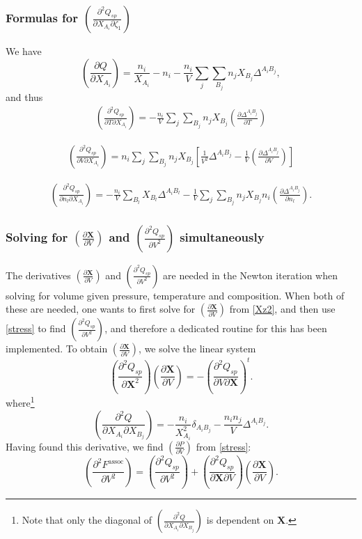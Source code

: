 \documentclass[internal,english]{sintefmemo2012}
\newcommand{\mbf}[0]{\mathbf}
\newcommand*{\pder}[2]{\left(\frac{\partial #1}{\partial #2}\right)}
\newcommand*{\pdder}[2]{\left(\frac{\partial^2 #1}{\partial #2^2}\right)}
\newcommand*{\pdcross}[3]{\left(\frac{\partial^2 #1}{\partial #2 \partial #3}\right)}
\newcommand{\z}{\zeta}
\begin{document}
\subsubsection{Formulas for $\pdcross{Q_{sp}}{X_{A_i}}{\z_1}$}
We have
\begin{equation}
  \pder{Q}{X_{A_i}} = \frac{n_i}{X_{A_i}} - n_i  - \frac{n_i}{V} \sum_{j} \sum_{B_j} n_j X_{B_j} \Delta^{A_i B_j},
\end{equation}
and thus
\begin{align*}
  \pdcross{Q_{sp}}{T}{X_{A_i}} = -\frac{n_i}{V} \sum_{j} \sum_{B_j} n_j X_{B_j} \pder{\Delta^{A_i B_j}}{T}
\end{align*}

\begin{align*}
  \pdcross{Q_{sp}}{V}{X_{A_i}} = n_i \sum_{j} \sum_{B_j} n_j X_{B_j} \left[ \frac{1}{V^2} \Delta^{A_i B_j} - \frac{1}{V} \pder{\Delta^{A_i B_j}}{V} \right]
\end{align*}

\begin{align*}
  \pdcross{Q_{sp}}{n_l}{X_{A_i}} = - \frac{n_i}{V} \sum_{B_l} X_{B_l} \Delta^{A_i B_l} - \frac{1}{V} \sum_{j} \sum_{B_j} n_j X_{B_j} n_i \pder{\Delta^{A_i B_j}}{n_l}.
\end{align*}

\subsubsection{Solving for $\pder{\mbf X}{V}$ and $\pdder{Q_{sp}}{V}$ simultaneously}
The derivatives $\pder{\mbf X}{V}$ and $\pdder{Q_{sp}}{V}$ are needed in the
Newton iteration when solving for volume given pressure, temperature and
composition. When both of these are needed, one wants to first solve for
$\pder{\mbf X}{V}$ from \eqref{Xz2}, and then use \eqref{stress} to find
$\pdder{Q_{sp}}{V}$, and therefore a dedicated routine for this has been
implemented. To obtain $\pder{\mbf X}{V}$, we solve the linear system
\begin{equation}
  \pdder{Q_{sp}}{\mbf X} \pder{\mbf X}{V} = -\pdcross{Q_{sp}}{V}{\mbf X}^t.
\end{equation}
where\footnote{Note that only the diagonal of $\pdcross{Q}{X_{A_i}}{X_{B_j}}$ is dependent on $\mbf X$.}
\begin{equation}
  \pdcross{Q}{X_{A_i}}{X_{B_j}} = -\frac{n_i}{X_{A_i}^2} \delta_{A_i B_j} - \frac{n_i n_j}{V} \Delta^{A_i B_j}.
\end{equation}
Having found this derivative, we find $\pder{P}{V}$ from \eqref{stress}:
\begin{equation}
    \pdder{F^{\text{assoc}}}{V} = \pdder{Q_{sp}}{V} + \pdcross{Q_{sp}}{\mbf X}{V} \pder{\mbf X}{V}.
\end{equation}
\end{document}
